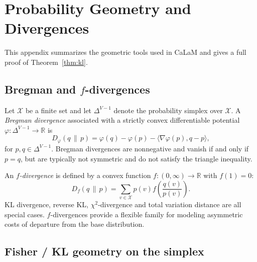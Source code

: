 \documentclass{article}
\theoremstyle{plain}
\theoremstyle{definition}
\theoremstyle{remark}
\begin{document}




\clearpage
\onecolumn
\appendix
\section{Probability Geometry and Divergences}
\label{app:geometry}

This appendix summarizes the geometric tools used in CaLaM and gives a full proof of Theorem~\ref{thm:kl}.

\subsection{Bregman and \texorpdfstring{$f$}{f}-divergences}

Let $\mathcal{X}$ be a finite set and let $\Delta^{V-1}$ denote the probability simplex over $\mathcal{X}$.
A \emph{Bregman divergence} associated with a strictly convex differentiable potential $\varphi : \Delta^{V-1} \to \mathbb{R}$ is
\begin{equation}
  D_\varphi(q \,\|\, p)
  =
  \varphi(q) - \varphi(p) - \langle \nabla \varphi(p), q-p\rangle,
\end{equation}
for $p, q \in \Delta^{V-1}$.
Bregman divergences are nonnegative and vanish if and only if $p=q$, but are typically not symmetric and do not satisfy the triangle inequality.

An \emph{$f$-divergence} is defined by a convex function $f : (0,\infty) \to \mathbb{R}$ with $f(1)=0$:
\begin{equation}
  D_f(q \,\|\, p)
  =
  \sum_{v \in \mathcal{X}} p(v) f\!\left(\frac{q(v)}{p(v)}\right).
\end{equation}
KL divergence, reverse KL, $\chi^2$-divergence and total variation distance are all special cases.
$f$-divergences provide a flexible family for modeling asymmetric costs of departure from the base distribution.

\subsection{Fisher / KL geometry on the simplex}
\end{document}
